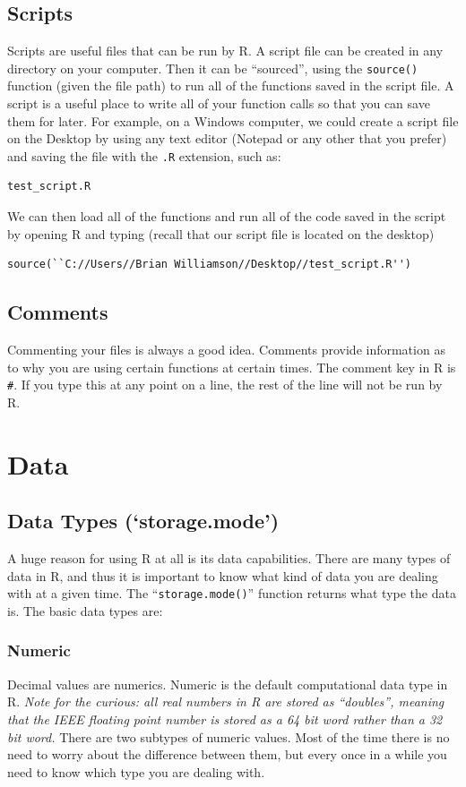 \documentclass[11pt,letterpaper,fleqn]{report}
\begin{document}
\section{Scripts}
Scripts are useful files that can be run by R. A script file can be created in any directory on your computer. Then it can be ``sourced'', using the \texttt{source()} function (given the file path) to run all of the functions saved in the script file. A script is a useful place to write all of your function calls so that you can save them for later. For example, on a Windows computer, we could create a script file on the Desktop by using any text editor (Notepad or any other that you prefer) and saving the file with the \texttt{.R} extension, such as:
\begin{verbatim}
test_script.R
\end{verbatim}
We can then load all of the functions and run all of the code saved in the script by opening R and typing (recall that our script file is located on the desktop)
\begin{verbatim}
source(``C://Users//Brian Williamson//Desktop//test_script.R'')
\end{verbatim}
\section{Comments}
Commenting your files is always a good idea. Comments provide information as to why you are using certain functions at certain times. The comment key in R is \texttt{\#}. If you type this at any point on a line, the rest of the line will not be run by R.

\chapter{Data}

\section{Data Types (`storage.mode')}
A huge reason for using R at all is its data capabilities. There are many types of data in R, and thus it is important to know what kind of data you are dealing with at a given time. The ``\texttt{storage.mode()}'' function returns what type the data is. The basic data types are:

\subsection{Numeric}
Decimal values are numerics. Numeric is the default computational data type in R. \emph{Note for the curious: all real numbers in R are stored as ``doubles'', meaning that the IEEE floating point number is stored as a 64 bit word rather than a 32 bit word.} There are two subtypes of numeric values. Most of the time there is no need to worry about the difference between them, but every once in a while you need to know which type you are dealing with.\\
\end{document}
